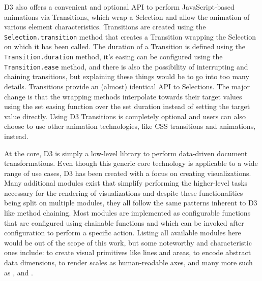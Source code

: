 D3 also offers a convenient and optional API to perform JavaScript-based animations via Transitions, which wrap a Selection and allow the animation of various element characteristics. 
Transitions are created using the \lstinline{Selection.transition} method that creates a Transition wrapping the Selection on which it has been called. 
The duration of a Transition is defined using the \lstinline{Transition.duration} method, it's easing can be configured using the \lstinline{Transition.ease} method, and there is also the possibility of interrupting and chaining transitions, but explaining these things would be to go into too many details. Transitions provide an (almost) identical API to Selections. The major change is that the wrapping methods interpolate towards their target values using the set easing function over the set duration instead of setting the target value directly. Using D3 Transitions is completely optional and users can also choose to use other animation technologies, like CSS transitions and animations, instead.

At the core, D3 is simply a low-level library to perform data-driven document transformations. 
Even though this generic core technology is applicable to a wide range of use cases, D3 has been created with a focus on creating visualizations.
Many additional modules exist that simplify performing the higher-level tasks necessary for the rendering of visualizations and despite these functionalities being split on multiple modules, they all follow the same patterns inherent to D3 like method chaining. 
Most modules are implemented as configurable functions that are configured using chainable functions and which can be invoked after configuration to perform a specific action.
Listing all available modules here would be out of the scope of this work, but some noteworthy and characteristic ones include:  to create visual primitives like lines and areas,  to encode abstract data dimensions,  to render scales as human-readable axes, and many more such as ,  and .



